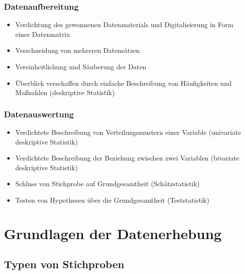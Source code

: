 \documentclass[
  11pt,
  ngerman,
  a4paper,
]{report}
\providecommand{\tightlist}{%
  \setlength{\itemsep}{0pt}\setlength{\parskip}{0pt}}
\begin{document}
\hypertarget{datenaufbereitung}{%
\subsubsection{Datenaufbereitung}\label{datenaufbereitung}}

\begin{itemize}
\tightlist
\item
  Verdichtung des gewonnenen Datenmaterials und Digitalisierung in Form einer Datenmatrix
\item
  Verschneidung von mehreren Datensätzen
\item
  Vereinheitlichung und Säuberung der Daten
\item
  Überblick verschaffen durch einfache Beschreibung von Häufigkeiten und Maßzahlen (deskriptive Statistik)
\end{itemize}

\hypertarget{datenauswertung}{%
\subsubsection{Datenauswertung}\label{datenauswertung}}

\begin{itemize}
\tightlist
\item
  Verdichtete Beschreibung von Verteilungsmustern einer Variable (univariate deskriptive Statistik)
\item
  Verdichtete Beschreibung der Beziehung zwischen zwei Variablen (bivariate deskriptive Statistik)
\item
  Schluss von Stichprobe auf Grundgesamtheit (Schätzstatistik)
\item
  Testen von Hypothesen über die Grundgesamtheit (Teststatistik)
\end{itemize}

\hypertarget{grundlagen-der-datenerhebung}{%
\section{Grundlagen der Datenerhebung}\label{grundlagen-der-datenerhebung}}

\nopagebreak

\hypertarget{typen-von-stichproben}{%
\subsection{Typen von Stichproben}\label{typen-von-stichproben}}

\nopagebreak
\end{document}
